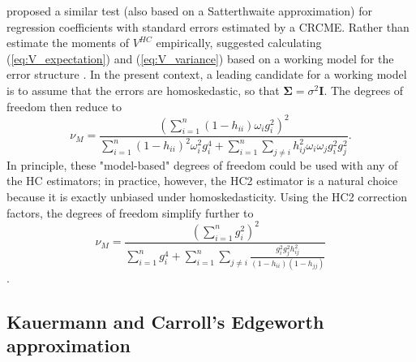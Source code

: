 \documentclass[12pt]{article}\usepackage[]{graphicx}\usepackage[]{color}
\newcommand{\bm}{\mathbf}
\newcommand{\bs}{\boldsymbol}
\begin{document}
\citet{Bell2002bias} proposed a similar test (also based on a Satterthwaite approximation) for regression coefficients with standard errors estimated by a CRCME. 
Rather than estimate the moments of $V^{HC}$ empirically, \citet{Bell2002bias} suggested calculating (\ref{eq:V_expectation}) and (\ref{eq:V_variance}) based on a working model for the error structure \citep[see also][]{Imbens2015robust}. 
In the present context, a leading candidate for a working model is to assume that the errors are homoskedastic, so that $\bs\Sigma = \sigma^2 \bm{I}$.
The degrees of freedom then reduce to 
\begin{equation}
\label{eq:nu_hom}
\nu_M = \frac{\displaystyle{\left(\sum_{i=1}^n (1 - h_{ii})\omega_i g_i^2 \right)^2}}{\displaystyle{\sum_{i=1}^n (1 - h_{ii})^2 \omega_i^2 g_i^4 + \sum_{i=1}^n \sum_{j \neq i} h_{ij}^2 \omega_i \omega_j g_i^2 g_j^2}}.
\end{equation}
In principle, these "model-based" degrees of freedom could be used with any of the HC estimators; in practice, however, the HC2 estimator is a natural choice because it is exactly unbiased under homoskedasticity. 
Using the HC2 correction factors, the degrees of freedom simplify further to
\begin{equation}
\label{eq:nu_hom_HC2}
\nu_M = \frac{\displaystyle{\left(\sum_{i=1}^n g_i^2\right)^2}}{\displaystyle{\sum_{i=1}^n g_i^4 + \sum_{i=1}^n \sum_{j \neq i} \frac{g_i^2 g_j^2 h_{ij}^2}{(1 - h_{ii})(1 - h_{jj})}}}
\end{equation}
\citep[cf.][Eq. 5]{Kauermann2001note}. 

\subsection{Kauermann and Carroll's Edgeworth approximation}
\end{document}
